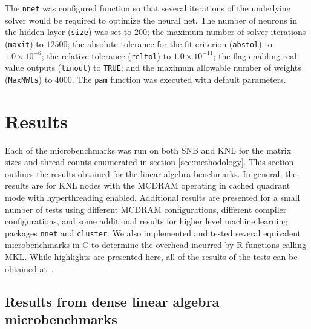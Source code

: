 The \texttt{nnet} was configured function so that several iterations of the underlying
solver would be required to optimize the neural net. The number of neurons in the hidden
layer (\texttt{size}) was set to $200$; the maximum number of solver iterations
(\texttt{maxit}) to $12500$; the absolute tolerance for the fit criterion
(\texttt{abstol}) to $1.0\times 10^{-6}$; the relative tolerance (\texttt{reltol}) to
$1.0\times 10^{-11}$; the flag enabling real-value outputs (\texttt{linout}) to
\texttt{TRUE}; and the maximum allowable number of weights (\texttt{MaxNWts}) to $4000$.
The \texttt{pam} function was executed with default parameters.

\section{Results} \label{sec:results}

Each of the microbenchmarks was run on both SNB and KNL for the matrix sizes and thread
counts enumerated in section \ref{sec:methodology}. This section outlines the results
obtained for the linear algebra benchmarks. In general, the results are for KNL
nodes with the MCDRAM operating in cached quadrant mode with hyperthreading enabled.
Additional results are presented for a small number of tests using different MCDRAM
configurations, different compiler configurations, and some additional results for higher
level machine learning packages \texttt{nnet} and \texttt{cluster}. We also implemented
and tested several equivalent microbenchmarks in C to determine the overhead incurred by R
functions calling MKL. While highlights are presented here, all of the results of the
tests can be obtained at~\cite{iu:stamp2017}.

\subsection{Results from dense linear algebra microbenchmarks}

